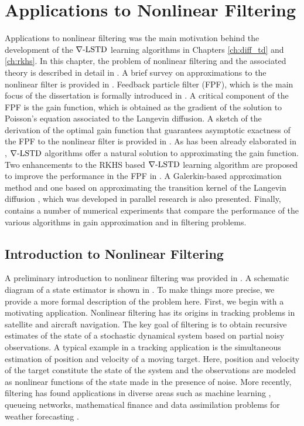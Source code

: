 \chapter{Applications to Nonlinear Filtering} 
\label{ch:filtering}
Applications to nonlinear filtering was the main motivation behind the development of the $\nabla\text{-LSTD}$ learning algorithms in Chapters \ref{ch:diff_td} and \ref{ch:rkhs}. In this chapter, the problem of nonlinear filtering and the associated theory is described in detail in . A brief survey on approximations to the nonlinear filter is provided in . Feedback particle filter (FPF), which is the main focus of the dissertation is formally introduced in . A critical component of the FPF is the gain function, which is obtained as the gradient of the solution to Poisson's equation associated to the Langevin diffusion. A sketch of the derivation of the optimal gain function that guarantees asymptotic exactness of the FPF to the nonlinear filter is provided in . As has been already elaborated in , $\nabla\text{-LSTD}$ algorithms offer a natural solution to approximating the gain function. Two enhancements to the RKHS based $\nabla\text{-LSTD}$ learning algorithm are proposed to improve the performance in the FPF in . A Galerkin-based approximation method and one based on approximating the transition kernel of the Langevin diffusion \cite{tagmeh16a}, which was developed in parallel research is also presented. Finally,  contains a number of numerical experiments that compare the performance of the various algorithms in gain approximation and in filtering problems.  

\section{Introduction to Nonlinear Filtering} 
\label{s:nl_filtering_intro}
A preliminary introduction to nonlinear filtering was provided in . A schematic diagram of a state estimator is shown in . To make things more precise, we provide a more formal description of the problem here. First, we begin with a motivating application. Nonlinear filtering has its origins in tracking problems in satellite and aircraft navigation. The key goal of filtering is to obtain recursive estimates of the state of a stochastic dynamical system based on partial noisy observations. A typical example in a tracking application is the simultaneous estimation of position and velocity of a moving target. Here, position and velocity of the target constitute the state of the system and the observations are modeled as nonlinear functions of the state made in the presence of noise. More recently, filtering has found applications in diverse areas such as machine learning \cite{bishop06}, queueing networks, mathematical finance \cite{brihan08} and data assimilation problems for weather forecasting \cite{eve94}. 

